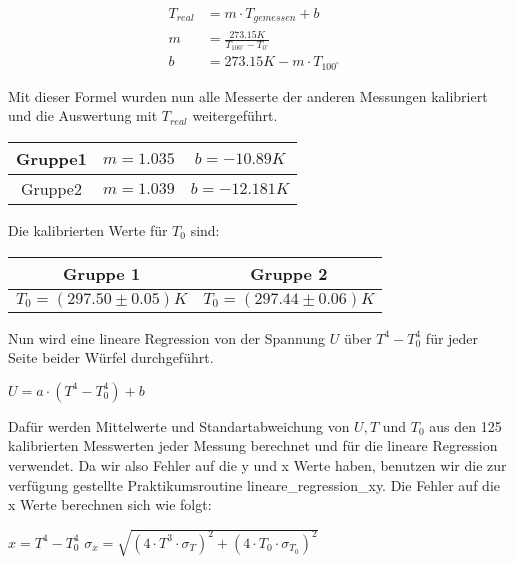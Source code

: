 \documentclass[a4paper, 11pt]{article}
\begin{document}
\begin{align*}
T_{real}&=m \cdot T_{gemessen}+b & \\
m&=\frac{273.15K}{T_{100^\circ}-T_{0^\circ}}&\\
b&=273.15K-m \cdot T_{100^\circ}&
\end{align*}

Mit dieser Formel wurden nun alle Messerte der anderen Messungen kalibriert und die Auswertung mit $T_{real}$ weitergeführt.
\begin{center}
\begin{tabular}{|c|c|c|}
\hline Gruppe1 & $m= 1.035$ & $b=-10.89 K$\\
\hline Gruppe2 & $m= 1.039 $ & $b= -12.181 K$\\
\hline
\end{tabular}
\end{center}
Die kalibrierten Werte für $T_0$ sind:
\begin{center}
\begin{tabular}{|c|c|}
\hline Gruppe 1& Gruppe 2\\
\hline $T_0= (297.50 \pm 0.05) K$ & $T_0= (297.44 \pm 0.06)   K$\\
\hline

\end{tabular}
\end{center}

Nun wird eine lineare Regression von der Spannung $U$ über $T^4-T_0^4$ für jeder Seite beider Würfel durchgeführt.
\begin{center}
$U=a\cdot (T^4-T_0^4)+b$
\end{center} 
Dafür werden Mittelwerte und Standartabweichung von $U,T$ und $T_0$ aus den 125 kalibrierten Messwerten jeder Messung berechnet und für die lineare Regression verwendet.
Da wir also Fehler auf die y und x Werte haben, benutzen wir die zur verfügung gestellte Praktikumsroutine lineare\_regression\_xy. 
Die Fehler auf die x Werte berechnen sich wie folgt:

\begin{center}
$ x=T^4-T_0^4$ \;\;\;\;\;\;\;\;$ \sigma_x = \sqrt{(4 \cdot T^3 \cdot\sigma_T)^2+(4\cdot T_0\cdot \sigma_{T_0})^2} $
\end{center}
\end{document}
